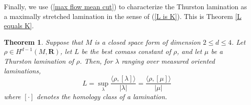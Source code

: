 \documentclass[reqno,11pt]{amsart}
\newcommand{\ZZ}{\mathbf{Z}}
\newcommand{\RR}{\mathbf{R}}
\newcommand{\Sph}{\mathbf S}
\newcommand*\dif{\mathop{}\!\mathrm{d}}
\newtheorem{theorem}{Theorem}[section]
\newtheorem{mainthm}{Theorem}
\theoremstyle{definition}
\numberwithin{equation}{section}
\begin{document}
Finally, we use (\ref{max flow mean cut}) to characterize the Thurston lamination as a maximally stretched lamination in the sense of (\ref{L is K}).
This is Theorem \ref{L equals K}.

\begin{mainthm}\label{LK}
Suppose that $M$ is a closed space form of dimension $2 \leq d \leq 4$.
Let $\rho \in H^{d - 1}(M, \RR)$, let $L$ be the best comass constant of $\rho$, and let $\mu$ be a Thurston lamination of $\rho$. Then, for $\lambda$ ranging over measured oriented laminations,
$$L = \sup_\lambda \frac{\langle \rho, [\lambda]\rangle}{|\lambda|} = \frac{\langle \rho, [\mu]\rangle}{|\mu|}$$
where $[\cdot]$ denotes the homology class of a lamination.
\end{mainthm}




\end{document}
